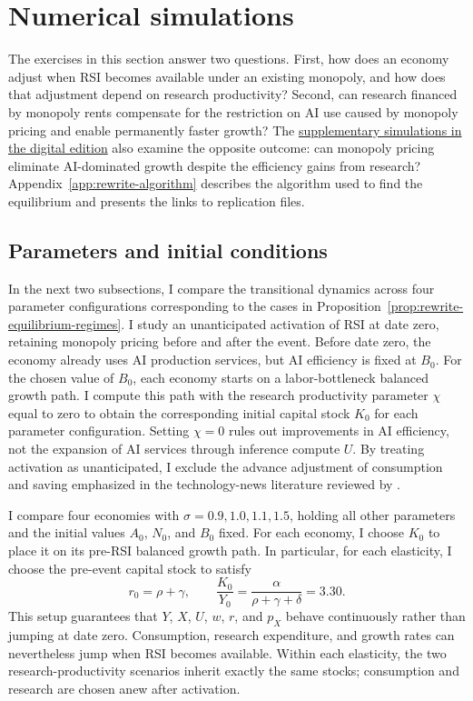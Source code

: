 \section{Numerical simulations}
\label{sec:rewrite-quantitative}

The exercises in this section answer two questions. First, how does an economy adjust
when RSI becomes available under an existing monopoly, and how does that
adjustment depend on research productivity?  Second, can research financed
by monopoly rents compensate for the restriction on AI use caused by monopoly pricing and enable permanently
faster growth? The
\href{https://oliverpardo1979.github.io/ai-growth-and-labor/\#subsec:rewrite-monopoly-growth-reversal}{supplementary simulations in the digital edition}
also examine the opposite outcome: can monopoly pricing eliminate
AI-dominated growth despite the efficiency gains from research?
Appendix~\ref{app:rewrite-algorithm}
describes the algorithm used to find the equilibrium and presents the links to replication files.

\subsection{Parameters and initial conditions}
\label{subsec:rewrite-rsi-activation}

In the next two subsections, I compare the transitional dynamics across four parameter configurations corresponding to the cases in Proposition~\ref{prop:rewrite-equilibrium-regimes}. I study an unanticipated activation of RSI at date zero, retaining monopoly pricing before and after the event. Before date zero, the economy already uses AI production services, but AI efficiency is fixed at $B_0$. For the chosen value of $B_0$, each economy starts on a labor-bottleneck balanced growth path. I compute this path with the research productivity parameter $\chi$ equal to zero to obtain the corresponding initial capital stock $K_0$ for each parameter configuration. Setting $\chi=0$ rules out improvements in AI efficiency, not the expansion of AI services through inference compute $U$. By treating activation as unanticipated, I exclude the advance adjustment of consumption and saving emphasized in the technology-news literature reviewed by \citet{beaudryportier2014}.

I compare four economies with $\sigma=0.9,1.0,1.1,1.5$, holding all other parameters and the initial values $A_0$, $N_0$, and $B_0$ fixed. For each economy, I choose $K_0$ to place it on its pre-RSI balanced growth path. In particular, for each elasticity, I choose the pre-event capital stock to satisfy
\begin{equation}
 r_0=\rho+\gamma,\qquad
 \frac{K_0}{Y_0}=\frac{\alpha}{\rho+\gamma+\delta}=3.30.
 \label{eq:rewrite-rsi-initial-ratio}
\end{equation}
This setup guarantees that $Y$, $X$, $U$, $w$, $r$, and $p_X$ behave continuously rather than jumping at date zero.
Consumption, research expenditure, and growth rates can nevertheless jump when RSI becomes available. Within
each elasticity, the two research-productivity scenarios inherit exactly
the same stocks; consumption and research are chosen anew after activation.

